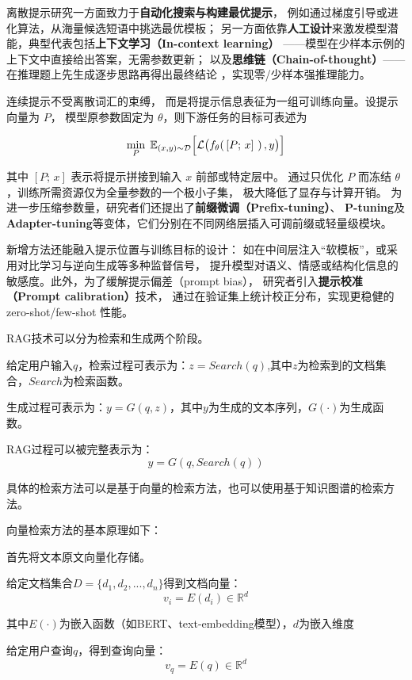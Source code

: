 \documentclass{xmu}
\begin{document}
离散提示研究一方面致力于{\bf 自动化搜索与构建最优提示}，
例如通过梯度引导或进化算法，从海量候选短语中挑选最优模板；
另一方面依靠{\bf 人工设计}来激发模型潜能，典型代表包括{\bf 上下文学习（In-context learning）}
——模型在少样本示例的上下文中直接给出答案，无需参数更新；
以及{\bf 思维链（Chain-of-thought）}——在推理题上先生成逐步思路再得出最终结论
，实现零/少样本强推理能力。

连续提示不受离散词汇的束缚，
而是将提示信息表征为一组可训练向量。设提示向量为 $P$，
模型原参数固定为 $\theta$，则下游任务的目标可表述为

$$
\min_{P}\;\mathbb{E}_{(x,y)\sim \mathcal{D}}\Bigl[\mathcal{L}\bigl(f_{\theta}(\,[P;\,x]\ )\,,y\bigr)\Bigr]
$$

其中 $[P;\,x]$ 表示将提示拼接到输入 $x$ 前部或特定层中。
通过只优化 $P$ 而冻结 $\theta$，训练所需资源仅为全量参数的一个极小子集，
极大降低了显存与计算开销。
为进一步压缩参数量，研究者们还提出了{\bf 前缀微调（Prefix-tuning）}、
{\bf P-tuning}及{\bf Adapter-tuning}等变体，它们分别在不同网络层插入可调前缀或轻量级模块。

新增方法还能融入提示位置与训练目标的设计：
如在中间层注入“软模板”，或采用对比学习与逆向生成等多种监督信号，
提升模型对语义、情感或结构化信息的敏感度。此外，为了缓解提示偏差（prompt bias），
研究者引入{\bf 提示校准（Prompt calibration）}技术，
通过在验证集上统计校正分布，实现更稳健的 zero-shot/few-shot 性能。

RAG技术可以分为检索和生成两个阶段。

给定用户输入$q$，检索过程可表示为：$z = Search(q)$,其中$z$为检索到的文档集合，$Search$为检索函数。

生成过程可表示为：$y = G(q,z)$，其中$y$为生成的文本序列，$G(·)$为生成函数。

RAG过程可以被完整表示为：
$$
y = G(q,Search(q))
$$

具体的检索方法可以是基于向量的检索方法，也可以使用基于知识图谱的检索方法。

向量检索方法的基本原理如下：

首先将文本原文向量化存储。

给定文档集合$D=\{d_1,d_2,...,d_n\}$得到文档向量：
$$
v_i = E(d_i) \in \mathbb{R}^d
$$

其中$E(·)$为嵌入函数（如BERT、text-embedding模型），$d$为嵌入维度

给定用户查询$q$，得到查询向量：
$$
v_q = E(q) \in \mathbb{R}^d
$$
\end{document}
